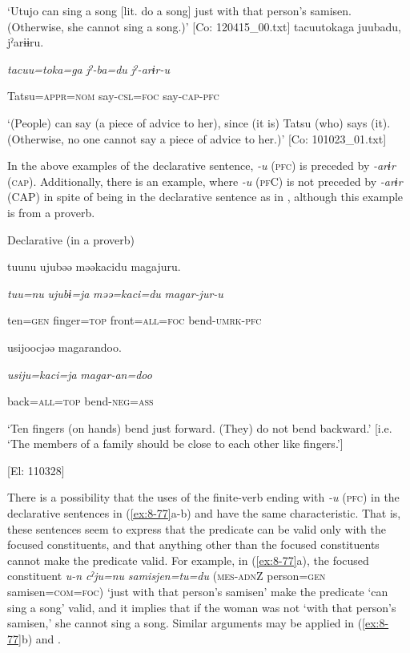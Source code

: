 \glt ‘Utujo can sing a song [lit. do a song] just with that person’s samisen. (Otherwise, she cannot sing a song.)’ [Co: 120415\_00.txt]
\ex {\TM}
\glll  tacuu{\textbar}toka{\textbar}ga  juubadu,  jˀarɨɨru.

      \textit{tacuu=toka=ga}  \textit{jˀ-ba=du}  \textit{jˀ-arɨr-u}

      Tatsu=\textsc{appr}=\textsc{nom}  say-\textsc{csl}=\textsc{foc}  say-\textsc{cap}-\textsc{pfc}

\glt ‘(People) can say (a piece of advice to her), since (it is) Tatsu (who) says (it). (Otherwise, no one cannot say a piece of advice to her.)’ [Co: 101023\_01.txt]
\z

In the above examples of the declarative sentence, \textit{{}-u} (\textsc{pfc}) is preceded by \textit{-arɨr} (\textsc{cap}). Additionally, there is an example, where \textit{-u} (\textsc{pf}C) is not preceded by \textit{{}-arɨr} (CAP) in spite of being in the declarative sentence as in , although this example is from a proverb.

\ea\label{ex:8-78}
  Declarative (in a proverb)

  {\TM}
\glll  tuunu  ujubəə  məəkacidu  magajuru.

    \textit{tuu=nu}  \textit{ujubɨ=ja}  \textit{məə=kaci=du}  \textit{magar-jur-u}

    ten=\textsc{gen}  finger=\textsc{top}  front=\textsc{all}=\textsc{foc}  bend-\textsc{umrk}-\textsc{pfc}

    usijoocjəə  magarandoo.

    \textit{usiju=kaci=ja}  \textit{magar-an=doo}

    back=\textsc{all}=\textsc{top}  bend-\textsc{neg}=\textsc{ass}

    ‘Ten fingers (on hands) bend just forward. (They) do not bend backward.’ [i.e. ‘The members of a family should be close to each other like fingers.’]

    [El: 110328]

There is a possibility that the uses of the finite-verb ending with \textit{{}-u} (\textsc{pfc}) in the declarative sentences in (\ref{ex:8-77}a-b) and  have the same characteristic. That is, these sentences seem to express that the predicate can be valid only with the focused constituents, and that anything other than the focused constituents cannot make the predicate valid. For example, in (\ref{ex:8-77}a), the focused constituent \textit{u-n} \textit{cˀju=nu} \textit{samisjen=tu=du} (\textsc{mes}-\textsc{adn}Z person=\textsc{gen} samisen=\textsc{com}=\textsc{foc}) ‘just with that person’s samisen’ make the predicate ‘can sing a song’ valid, and it implies that if the woman was not ‘with that person’s samisen,’ she cannot sing a song. Similar arguments may be applied in (\ref{ex:8-77}b) and .

